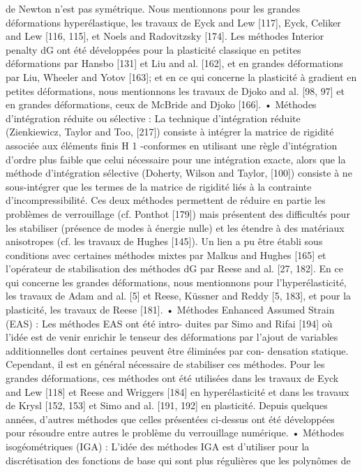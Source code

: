 de Newton n’est pas symétrique. Nous mentionnons pour les grandes déformations
hyperélastique, les travaux de Eyck and Lew [117], Eyck, Celiker and Lew [116, 115], et
Noels and Radovitzsky [174]. Les méthodes Interior penalty dG ont été développées pour
la plasticité classique en petites déformations par Hansbo [131] et Liu and al. [162],
et en grandes déformations par Liu, Wheeler and Yotov [163]; et en ce qui concerne la
plasticité à gradient en petites déformations, nous mentionnons les travaux de Djoko and
al. [98, 97] et en grandes déformations, ceux de McBride and Djoko [166].
• Méthodes d’intégration réduite ou sélective : La technique d’intégration réduite
(Zienkiewicz, Taylor and Too, [217]) consiste à intégrer la matrice de rigidité associée
aux éléments finis H 1 -conformes en utilisant une règle d’intégration d’ordre plus faible
que celui nécessaire pour une intégration exacte, alors que la méthode d’intégration
sélective (Doherty, Wilson and Taylor, [100]) consiste à ne sous-intégrer que les termes
de la matrice de rigidité liés à la contrainte d’incompressibilité. Ces deux méthodes
permettent de réduire en partie les problèmes de verrouillage (cf. Ponthot [179]) mais
présentent des difficultés pour les stabiliser (présence de modes à énergie nulle) et les
étendre à des matériaux anisotropes (cf. les travaux de Hughes [145]). Un lien a pu
être établi sous conditions avec certaines méthodes mixtes par Malkus and Hughes [165]
et l’opérateur de stabilisation des méthodes dG par Reese and al. [27, 182]. En ce qui
concerne les grandes déformations, nous mentionnons pour l’hyperélasticité, les travaux
de Adam and al. [5] et Reese, Küssner and Reddy [5, 183], et pour la plasticité, les travaux
de Reese [181].
• Méthodes Enhanced Assumed Strain (EAS) : Les méthodes EAS ont été intro-
duites par Simo and Rifai [194] où l’idée est de venir enrichir le tenseur des déformations
par l’ajout de variables additionnelles dont certaines peuvent être éliminées par con-
densation statique. Cependant, il est en général nécessaire de stabiliser ces méthodes.
Pour les grandes déformations, ces méthodes ont été utilisées dans les travaux de Eyck
and Lew [118] et Reese and Wriggers [184] en hyperélasticité et dans les travaux de Krysl
[152, 153] et Simo and al. [191, 192] en plasticité.
Depuis quelques années, d’autres méthodes que celles présentées ci-dessus ont été développées
pour résoudre entre autres le problème du verrouillage numérique.
• Méthodes isogéométriques (IGA) : L’idée des méthodes IGA est d’utiliser pour
la discrétisation des fonctions de base qui sont plus régulières que les polynômes de

